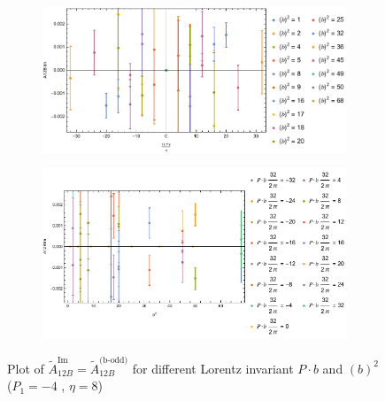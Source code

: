 \documentclass[]{article}
\numberwithin{equation}{section}
\newcommand{\tAmp}{\widetilde{A}}
\newcommand{\tAmp}{\ensuremath{\widetilde{A}^{(+)}}}
\begin{document}
\begin{figure}[h!]
     \centering
     \begin{subfigure}[b]{0.45\textwidth}
         \centering
         \includegraphics[width=\textwidth]{Amp_plots/bP_A12B_b_odd_P1_-4_eta_8.pdf}
     \end{subfigure}
     \begin{subfigure}[b]{0.45\textwidth}
         \centering
         \includegraphics[width=\textwidth]{Amp_plots/bsq_A12B_b_odd_P1_-4_eta_8.pdf}
     \end{subfigure}
        \caption{Plot of $\tAmp^{\text{Im}}_{12B}=\tAmp^{\text{(b-odd)}}_{12B}$ for different Lorentz invariant $P\cdot b$ and $(b)^2$  ($P_{1} = -4$ , $\eta=8$)}
\end{figure}
\pagebreak
\end{document}
